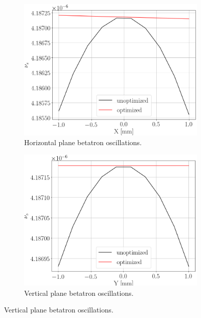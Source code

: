 \documentclass[]{elsarticle}
\begin{document}
\begin{figure}[h]
  \begin{subfigure}{\linewidth}
    \includegraphics[width=\linewidth]{img/decoh/spin_tune_decoh_x_offset}
    \caption{Horizontal plane betatron oscillations.}
  \end{subfigure}
  \begin{subfigure}{\linewidth}
    \includegraphics[width=\linewidth]{img/decoh/spin_tune_decoh_y_offset}
    \caption{Vertical plane betatron oscillations.}
  \end{subfigure}
\end{figure}
\end{document}
